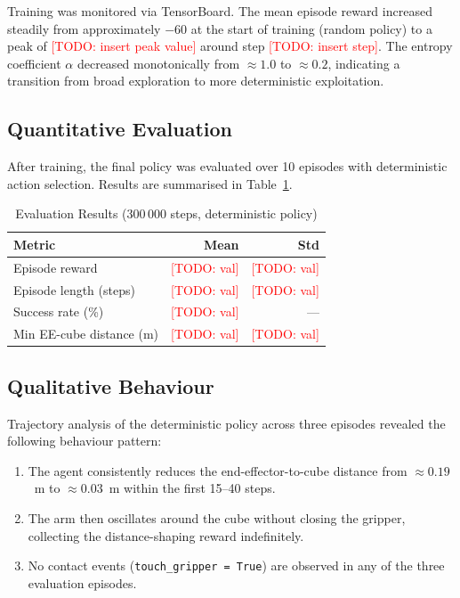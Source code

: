 \documentclass[conference]{IEEEtran}
\newcommand{\todo}[1]{\textcolor{red}{[TODO: #1]}}  %
\begin{document}
Training was monitored via TensorBoard.
The mean episode reward increased steadily from approximately
$-60$ at the start of training (random policy) to a peak of
\todo{insert peak value} around step \todo{insert step}.
The entropy coefficient $\alpha$ decreased monotonically from
$\approx 1.0$ to $\approx 0.2$, indicating a transition from
broad exploration to more deterministic exploitation.

\subsection{Quantitative Evaluation}

After training, the final policy was evaluated over 10 episodes
with deterministic action selection.
Results are summarised in Table~\ref{tab:eval}.

\begin{table}[h]
    \centering
    \caption{Evaluation Results (300\,000 steps, deterministic policy)}
    \label{tab:eval}
    \begin{tabular}{lrr}
        \toprule
        Metric & Mean & Std \\
        \midrule
        Episode reward          & \todo{val} & \todo{val} \\
        Episode length (steps)  & \todo{val} & \todo{val} \\
        Success rate (\%)       & \todo{val} & —          \\
        Min EE-cube distance (m)& \todo{val} & \todo{val} \\
        \bottomrule
    \end{tabular}
\end{table}

\subsection{Qualitative Behaviour}

Trajectory analysis of the deterministic policy across three
episodes revealed the following behaviour pattern:

\begin{enumerate}
    \item The agent consistently reduces the end-effector-to-cube
          distance from $\approx 0.19$~m to $\approx 0.03$~m within
          the first 15--40 steps.
    \item The arm then oscillates around the cube without closing
          the gripper, collecting the distance-shaping reward
          indefinitely.
    \item No contact events (\texttt{touch\_gripper = True}) are
          observed in any of the three evaluation episodes.
\end{enumerate}
\end{document}
